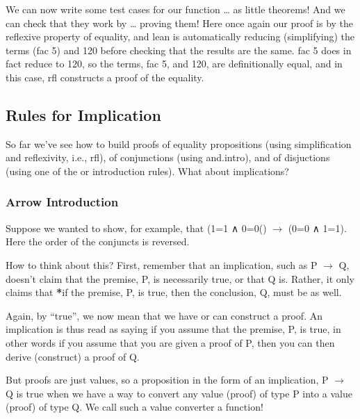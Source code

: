 \documentclass[letterpaper,10pt,english]{sphinxmanual}
\begin{document}
We can now write some test cases for our function … as little
theorems! And we can check that they work by … proving them! Here
once again our proof is by the reflexive property of equality, and
lean is automatically reducing (simplifying) the terms (fac 5) and 120
before checking that the results are the same. fac 5 does in fact
reduce to 120, so the terms, fac 5, and 120, are definitionally equal,
and in this case, rfl constructs a proof of the equality.

\begin{sphinxVerbatim}[commandchars=\\\{\}]
        
\end{sphinxVerbatim}


\subsection{Rules for Implication}
\label{\detokenize{15-proofs:rules-for-implication}}
So far we’ve see how to build proofs of equality propositions (using
simplification and reflexivity, i.e., rfl), of conjunctions (using
and.intro), and of disjuctions (using one of the or introduction
rules). What about implications?


\subsubsection{Arrow Introduction}
\label{\detokenize{15-proofs:arrow-introduction}}
Suppose we wanted to show, for example, that (1=1 ∧ 0=0() \(\rightarrow\) (0=0 ∧
1=1). Here the order of the conjuncts is reversed.

How to think about this? First, remember that an implication, such as
P \(\rightarrow\) Q, doesn’t claim that the premise, P, is necessarily true, or that
Q is. Rather, it only claims that {\color{red}\bfseries{}*}if the premise, P, is true, then
the conclusion, Q, must be as well.

Again, by “true”, we now mean that we have or can construct a
proof. An implication is thus read as saying if you assume that the
premise, P, is true, in other words if you assume that you are given a
proof of P, then you can then derive (construct) a proof of Q.

But proofs are just values, so a proposition in the form of an
implication, P \(\rightarrow\) Q is true when we have a way to convert any value
(proof) of type P into a value (proof) of type Q. We call such a value
converter a function!
\end{document}
